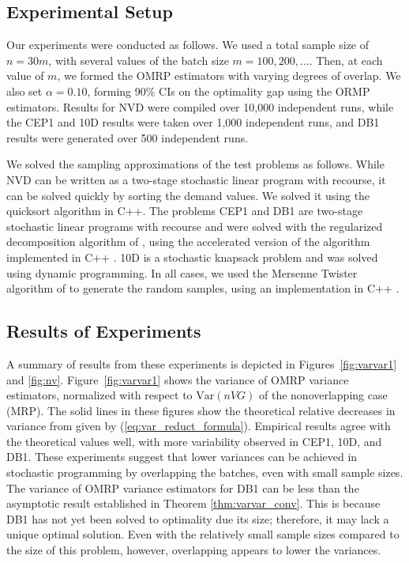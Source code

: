 \documentclass[12pt]{article}
\newcommand{\var}[1]{\mathrm{Var} \left( #1 \right)}
\begin{document}
\subsection{Experimental Setup}
\label{ssec:expS}


Our experiments were conducted as follows. 
We used a total sample size of $n = 30 m$, with several values of the batch size $m=100, 200, \ldots$. 
Then, at each value of $m$, we formed the OMRP estimators with varying degrees of overlap. 
We also set $\alpha=0.10$, forming 90\% CIs on the optimality gap using the ORMP estimators. 
Results for NVD were compiled over 10,000 independent runs, while the CEP1 and 10D results were taken over 1,000 independent runs, and DB1 results were generated over 500 independent runs.

We solved the sampling approximations of the test problems as follows.
While NVD can be written as a two-stage stochastic linear program with recourse, it can be solved quickly by sorting the demand values. 
We solved it using the quicksort algorithm in C++. 
The problems CEP1 and DB1 are two-stage stochastic linear programs with recourse and were solved with the regularized decomposition algorithm of \citet{ruszczynski1986regularized}, using the accelerated version of the algorithm implemented in C++ \citep{ruszczynski1997accelerating}. 
10D is a stochastic knapsack problem and was solved using dynamic programming.  
In all cases, we used the Mersenne Twister algorithm of \citet{matsumoto_nishimura_98} to generate the random samples, using an implementation in C++ \citep{wagner_twister_09}.




\subsection{Results of Experiments}
\label{ssec:results} 

A summary of results from these experiments is depicted in Figures~\ref{fig:varvar1} and \ref{fig:nv}.
Figure~\ref{fig:varvar1} shows the variance of OMRP variance estimators, normalized with respect to $\var{nVG}$ of the nonoverlapping case (MRP). 
The solid lines in these figures show the theoretical relative decreases in variance from \cite{Welch1987} given by (\ref{eq:var_reduct_formula}). 
Empirical results agree with the theoretical values well, with more variability observed in CEP1, 10D, and DB1. 
These experiments suggest that lower variances can be achieved in stochastic programming by overlapping the batches, even with small sample sizes.
The variance of OMRP variance estimators for DB1 can be less than the asymptotic result established in Theorem \ref{thm:varvar_conv}.
This is because DB1 has not yet been solved to optimality due its size; therefore, it may lack a unique optimal solution. 
Even with the relatively small sample sizes compared to the size of this problem, however, overlapping appears to lower the variances. 
\end{document}
